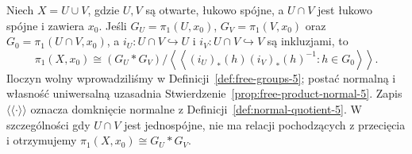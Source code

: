 \begin{twierdzenie}
\label{thm:van-kampen}
Niech $X=U\cup V$, gdzie $U,V$ są otwarte,
łukowo spójne, a $U\cap V$ jest łukowo
spójne i zawiera $x_0$. Jeśli
$G_U=\pi_1(U,x_0)$, $G_V=\pi_1(V,x_0)$
oraz $G_0=\pi_1(U\cap V,x_0)$, a
$i_U:U\cap V\hookrightarrow U$ i $i_V:U\cap V\hookrightarrow V$
są inkluzjami, to
\[
 \pi_1(X,x_0)\cong
 (G_U*G_V)/
 \left\langle\!\left\langle
 (i_U)_*(h)(i_V)_*(h)^{-1}:h\in G_0
 \right\rangle\!\right\rangle.
\]
Iloczyn wolny wprowadziliśmy w Definicji~\ref{def:free-groups-5};
postać normalną i własność uniwersalną uzasadnia
Stwierdzenie~\ref{prop:free-product-normal-5}. Zapis
$\langle\!\langle\cdot\rangle\!\rangle$
oznacza domknięcie normalne z
Definicji~\ref{def:normal-quotient-5}.
W szczególności gdy $U\cap V$ jest jednospójne,
nie ma relacji pochodzących z przecięcia i otrzymujemy
$\pi_1(X,x_0)\cong G_U*G_V$.
\end{twierdzenie}
